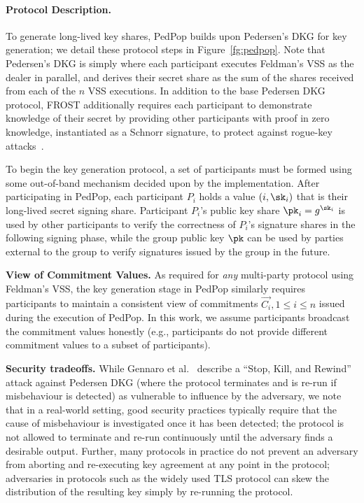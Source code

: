 \paragraph{Protocol Description.}
To generate long-lived key shares,
PedPop builds upon Pedersen's DKG for key generation; we detail
these protocol steps in
Figure~\ref{fg:pedpop}.
Note that Pedersen's DKG is
simply where each participant
executes Feldman's VSS as the dealer in parallel, and derives their
secret share as the sum of the shares received from each of the $n$
VSS executions. In addition to the
base Pedersen DKG protocol, FROST additionally requires each
participant to demonstrate knowledge of their secret by providing
other participants with proof in zero knowledge, instantiated as a Schnorr
signature, to protect against rogue-key attacks~\cite{BellareBS03}.

To begin the key generation protocol, a set of participants must be formed
using some out-of-band mechanism decided upon by the implementation.
After participating in PedPop, each participant $P_i$
holds a value
$(i, \sk_i)$ that is their long-lived secret signing share.
Participant $P_i$'s public key share $\pk_i = g^{\sk_i}$ is
used by other participants to verify the correctness of $P_i$'s
signature shares in the following signing phase, while
the group public key $\pk$ can be used by parties external to the group
to verify signatures issued by the group in the future.

\textbf{View of Commitment Values.} As required for \emph{any} multi-party
protocol using Feldman's VSS,
the key generation stage in PedPop
similarly requires participants to maintain a consistent view of commitments
$\Vec{C_i}, 1 \leq i \le n$
issued during the execution of PedPop. In this work, we
assume participants broadcast the
commitment values honestly (e.g., participants do not provide different
commitment values to a subset of participants).

\textbf{Security tradeoffs.} While Gennaro et al.~\cite{GennaroJKR07}
describe a ``Stop, Kill, and Rewind'' attack against Pedersen DKG (where the protocol
terminates and is re-run if misbehaviour is detected) as vulnerable to
influence by the adversary, we note that in a real-world setting,
good security practices typically require that the cause of misbehaviour is
investigated once it has been detected; the protocol is not allowed to
terminate and re-run continuously until
the adversary finds a desirable output.
Further, many protocols in practice do not prevent an adversary from
aborting and re-executing key agreement at any point in the protocol;
adversaries in protocols such as the widely used TLS protocol can skew the
distribution of the resulting key simply by re-running the protocol.

